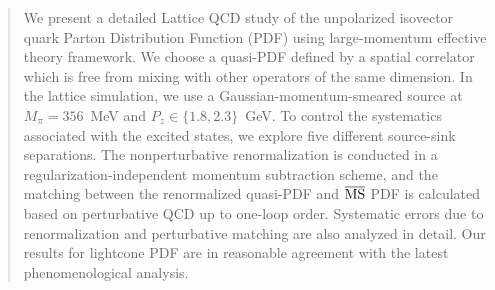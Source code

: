 \documentclass[11pt]{article}
\begin{document}
\begin{abstract}
We present a detailed Lattice QCD study of the unpolarized isovector quark Parton Distribution Function (PDF) using   large-momentum effective theory framework. We choose  a quasi-PDF  defined by a spatial correlator which is free from mixing with other operators of the same dimension.  In the lattice simulation, we use a Gaussian-momentum-smeared source  at $M_\pi=356$~MeV and $P_z \in \{1.8,2.3\}$~GeV.  To control the systematics associated with the excited states, we explore  {five different source-sink separations}.  The nonperturbative renormalization is conducted in a regularization-independent momentum subtraction scheme, and the matching between the renormalized quasi-PDF and $\overline{\rm MS}$ PDF is calculated based on perturbative QCD up to one-loop order. Systematic errors due to renormalization and perturbative matching are also analyzed in detail.  Our results for lightcone PDF are in reasonable agreement with the latest phenomenological analysis.
\end{abstract}







\end{document}
